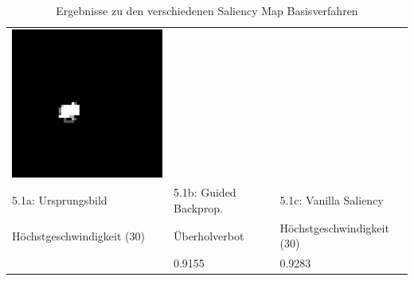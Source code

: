 \begin{table}
\begin{tabular}{p{4.5cm}p{4.5cm}p{4.5cm}}
		\includegraphics[width=\linewidth]{Images/AnPe/10771_vanil}\\ 
		5.1a: Ursprungsbild &5.1b: Guided Backprop. &5.1c: Vanilla Saliency \\
		Höchstgeschwindigkeit (30) & Überholverbot & Höchstgeschwindigkeit (30)\\
		& 0.9155 & 0.9283\\
		
	\end{tabular} 

	\caption{Ergebnisse zu den verschiedenen Saliency Map Basisverfahren }
	\label{tab:sal1}
\end{table}

